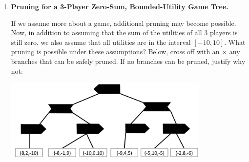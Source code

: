 \begin{enumerate}
\vspace{5cm}


\item {\bf Pruning for a 3-Player Zero-Sum, Bounded-Utility Game Tree.}

If we assume more about a game, additional pruning may become possible.  Now, in addition to assuming that the sum of the utilities of
all 3 players is still zero, we also assume that all utilities are in the interval $[-10, 10]$.
What pruning is possible under these assumptions?  Below, cross off with an $\times$ any branches that can be safely pruned.   If no branches can be pruned, justify why not:

\begin{center}
    \includegraphics[width=4in]{figures/skeleton}
\end{center}

\end{enumerate}